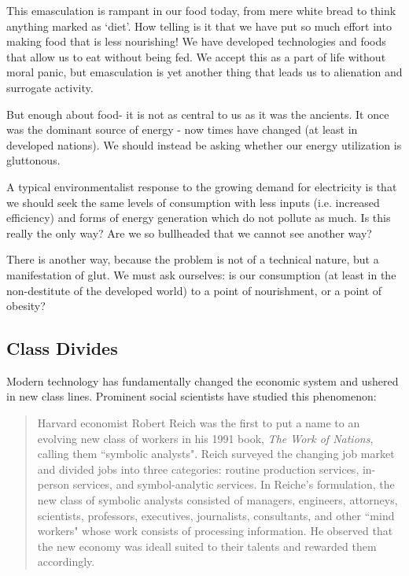 \documentclass[letterpaper]{article}
\begin{document}
This emasculation is rampant in our food today, from mere white bread to think anything marked as `diet'. How telling is it that we have put so much effort into making food that is less nourishing! We have developed technologies and foods that allow us to eat without being fed. We accept this as a part of life without moral panic, but emasculation is yet another thing that leads us to alienation and surrogate activity.

But enough about food- it is not as central to us as it was the ancients. It once was the dominant source of energy - now times have changed (at least in developed nations). We should instead be asking whether our energy utilization is gluttonous.

A typical environmentalist response to the growing demand for electricity is that we should seek the same levels of consumption with less inputs (i.e. increased efficiency) and forms of energy generation which do not pollute as much. Is this really the only way? Are we so bullheaded that we cannot see another way?

There is another way, because the problem is not of a technical nature, but a manifestation of glut. We must ask ourselves: is our consumption (at least in the non-destitute of the developed world) to a point of nourishment, or a point of obesity?


\subsection{Class Divides}


Modern technology has fundamentally changed the economic system and ushered in new class lines. Prominent social scientists have studied this phenomenon:

\begin{quote}
  Harvard economist Robert Reich was the first to put a name to an evolving new class of workers in his 1991 book, \textit{The Work of Nations}, calling them ``symbolic analysts". Reich surveyed the changing job market and divided jobs into three categories: routine production services, in-person services, and symbol-analytic services. In Reiche's formulation, the new class of symbolic analysts consisted of managers, engineers, attorneys, scientists, professors, executives, journalists, consultants, and other ``mind workers" whose work consists of processing information. He observed that the new economy was ideall suited to their talents and rewarded them accordingly.
\end{quote}
\end{document}

